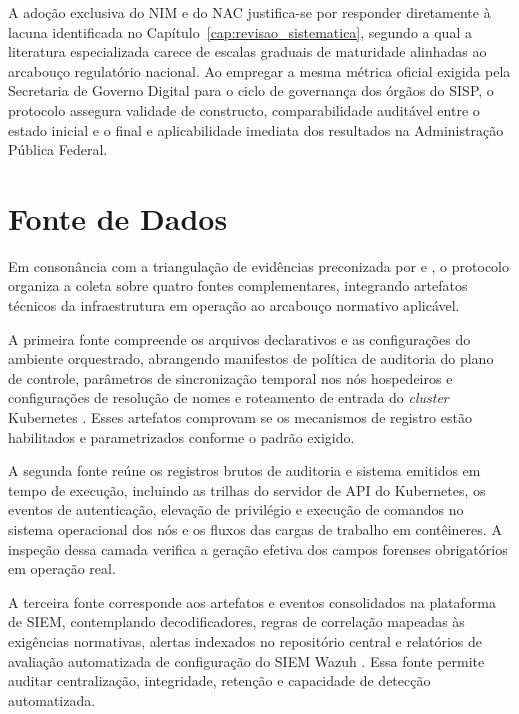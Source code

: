 A adoção exclusiva do NIM e do NAC justifica-se por responder diretamente à lacuna identificada no Capítulo~\ref{cap:revisao_sistematica}, segundo a qual a literatura especializada carece de escalas graduais de maturidade alinhadas ao arcabouço regulatório nacional. Ao empregar a mesma métrica oficial exigida pela Secretaria de Governo Digital para o ciclo de governança dos órgãos do SISP, o protocolo assegura validade de constructo, comparabilidade auditável entre o estado inicial e o final e aplicabilidade imediata dos resultados na Administração Pública Federal.

\section{Fonte de Dados}
\label{sec:ec_fonte_dados}

Em consonância com a triangulação de evidências preconizada por  e , o protocolo organiza a coleta sobre quatro fontes complementares, integrando artefatos técnicos da infraestrutura em operação ao arcabouço normativo aplicável.

A primeira fonte compreende os arquivos declarativos e as configurações do ambiente orquestrado, abrangendo manifestos de política de auditoria do plano de controle, parâmetros de sincronização temporal nos nós hospedeiros e configurações de resolução de nomes e roteamento de entrada do \textit{cluster} Kubernetes \cite{kubernetes2025}. Esses artefatos comprovam se os mecanismos de registro estão habilitados e parametrizados conforme o padrão exigido.

A segunda fonte reúne os registros brutos de auditoria e sistema emitidos em tempo de execução, incluindo as trilhas do servidor de API do Kubernetes, os eventos de autenticação, elevação de privilégio e execução de comandos no sistema operacional dos nós e os fluxos das cargas de trabalho em contêineres. A inspeção dessa camada verifica a geração efetiva dos campos forenses obrigatórios em operação real.

A terceira fonte corresponde aos artefatos e eventos consolidados na plataforma de SIEM, contemplando decodificadores, regras de correlação mapeadas às exigências normativas, alertas indexados no repositório central e relatórios de avaliação automatizada de configuração do SIEM Wazuh \cite{wazuh2025}. Essa fonte permite auditar centralização, integridade, retenção e capacidade de detecção automatizada.


